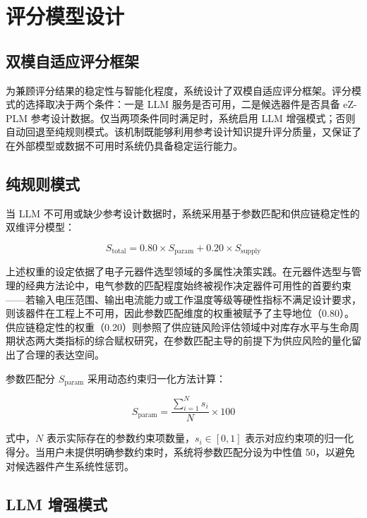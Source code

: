 \section{评分模型设计}
\subsection{双模自适应评分框架}

为兼顾评分结果的稳定性与智能化程度，系统设计了双模自适应评分框架。评分模式的选择取决于两个条件：一是 LLM 服务是否可用，二是候选器件是否具备 eZ-PLM 参考设计数据。仅当两项条件同时满足时，系统启用 LLM 增强模式；否则自动回退至纯规则模式。该机制既能够利用参考设计知识提升评分质量，又保证了在外部模型或数据不可用时系统仍具备稳定运行能力。

\subsection{纯规则模式}

当 LLM 不可用或缺少参考设计数据时，系统采用基于参数匹配和供应链稳定性的双维评分模型：

\begin{equation}
S_{\text{total}} = 0.80 \times S_{\text{param}} + 0.20 \times S_{\text{supply}}
\label{eq:rule}
\end{equation}

上述权重的设定依据了电子元器件选型领域的多属性决策实践。在元器件选型与管理的经典方法论中，电气参数的匹配程度始终被视作决定器件可用性的首要约束——若输入电压范围、输出电流能力或工作温度等级等硬性指标不满足设计要求，则该器件在工程上不可用，因此参数匹配维度的权重被赋予了主导地位（0.80）\cite{pecht2008parts}。供应链稳定性的权重（0.20）则参照了供应链风险评估领域中对库存水平与生命周期状态两大类指标的综合赋权研究\cite{chen2021supplyrisk,goel2021supply}，在参数匹配主导的前提下为供应风险的量化留出了合理的表达空间。

参数匹配分 $S_{\text{param}}$ 采用动态约束归一化方法计算：

\begin{equation}
S_{\text{param}} = \frac{\displaystyle\sum_{i=1}^{N} s_i}{N} \times 100
\label{eq:param}
\end{equation}

式中，$N$ 表示实际存在的参数约束项数量，$s_i \in [0,1]$ 表示对应约束项的归一化得分。当用户未提供明确参数约束时，系统将参数匹配分设为中性值 50，以避免对候选器件产生系统性惩罚。

\subsection{LLM 增强模式}

